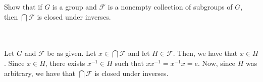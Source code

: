 Show that if $G$ is a group and $\mathcal{F}$ is a nonempty collection of subgroups of $G$, then
$\bigcap\mathcal{F}$ is closed under inverses.\\\\

\begin{solution}\renewcommand{\qedsymbol}{}\ \\
    Let $G$ and $\mathcal{F}$ be as given. Let $x\in\bigcap\mathcal{F}$ and let $H\in\mathcal{F}$. Then,
    we have that $x\in H$. Since $x\in H$, there exists $x^{-1}\in H$ such that $xx^{-1}=x^{-1}x=e$.
    Now, since $H$ was arbitrary, we have that $\bigcap\mathcal{F}$ is closed under inverses.

\end{solution}